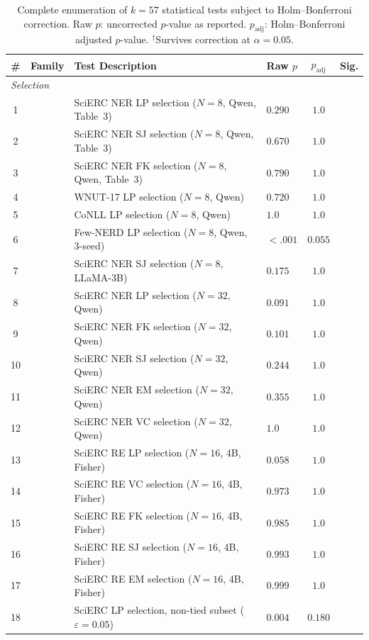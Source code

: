 \begin{table}[t]
\centering
\small
\caption{Complete enumeration of $k{=}57$ statistical tests subject to Holm--Bonferroni correction. Raw $p$: uncorrected $p$-value as reported. $p_{\text{adj}}$: Holm--Bonferroni adjusted $p$-value. $^\dagger$Survives correction at $\alpha{=}0.05$.}
\label{tab:holm_family}
\begin{tabular}{clllcc}
\toprule
\# & Family & Test Description & Raw $p$ & $p_{\text{adj}}$ & Sig. \\
\midrule
\multicolumn{6}{l}{\textit{Selection}} \\
1 & & SciERC NER LP selection ($N{=}8$, Qwen, Table~3) & $0.290$ & $1.0$ &  \\
2 & & SciERC NER SJ selection ($N{=}8$, Qwen, Table~3) & $0.670$ & $1.0$ &  \\
3 & & SciERC NER FK selection ($N{=}8$, Qwen, Table~3) & $0.790$ & $1.0$ &  \\
4 & & WNUT-17 LP selection ($N{=}8$, Qwen) & $0.720$ & $1.0$ &  \\
5 & & CoNLL LP selection ($N{=}8$, Qwen) & $1.0$ & $1.0$ &  \\
6 & & Few-NERD LP selection ($N{=}8$, Qwen, 3-seed) & ${<}.001$ & $0.055$ &  \\
7 & & SciERC NER SJ selection ($N{=}8$, LLaMA-3B) & $0.175$ & $1.0$ &  \\
8 & & SciERC NER LP selection ($N{=}32$, Qwen) & $0.091$ & $1.0$ &  \\
9 & & SciERC NER FK selection ($N{=}32$, Qwen) & $0.101$ & $1.0$ &  \\
10 & & SciERC NER SJ selection ($N{=}32$, Qwen) & $0.244$ & $1.0$ &  \\
11 & & SciERC NER EM selection ($N{=}32$, Qwen) & $0.355$ & $1.0$ &  \\
12 & & SciERC NER VC selection ($N{=}32$, Qwen) & $1.0$ & $1.0$ &  \\
13 & & SciERC RE LP selection ($N{=}16$, 4B, Fisher) & $0.058$ & $1.0$ &  \\
14 & & SciERC RE VC selection ($N{=}16$, 4B, Fisher) & $0.973$ & $1.0$ &  \\
15 & & SciERC RE FK selection ($N{=}16$, 4B, Fisher) & $0.985$ & $1.0$ &  \\
16 & & SciERC RE SJ selection ($N{=}16$, 4B, Fisher) & $0.993$ & $1.0$ &  \\
17 & & SciERC RE EM selection ($N{=}16$, 4B, Fisher) & $0.999$ & $1.0$ &  \\
18 & & SciERC LP selection, non-tied subset ($\varepsilon{=}0.05$) & $0.004$ & $0.180$ &  \\

\end{tabular}
\end{table}
